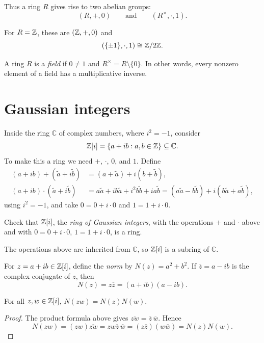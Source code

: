\documentclass[reqno,11pt]{amsart}
\newcommand{\C}{\mathbb{C}}
\begin{document}
Thus a ring $R$ gives rise to two abelian groups:
\[
  (R,+,0)\qquad\text{and}\qquad(R^\times,\cdot,1).
\]

\begin{example}
For $R=\mathbb{Z}$, these are $(\mathbb{Z},+,0)$ and
\[
  (\{\pm1\},\cdot,1)\cong\mathbb{Z}/2\mathbb{Z}.
\]
\end{example}

\begin{define}[Field]
A ring $R$ is a \emph{field} if $0\neq1$ and
$R^\times=R\setminus\{0\}$. In other words, every nonzero element
of a field has a multiplicative inverse.
\end{define}

\section{Gaussian integers}

\begin{example}
Inside the ring $\C$ of complex numbers, where $i^2=-1$, consider
\[
  \Z[i]=\{a+ib:a,b\in\Z\}\subseteq\C.
\]
To make this a ring we need $+$, $\cdot$, $0$, and $1$. Define
\begin{align*}
  (a+ib)+(\tilde a+i\tilde b)&=(a+\tilde a)+i(b+\tilde b),\\
  (a+ib)\cdot(\tilde a+i\tilde b)
  &=a\tilde a+ib\tilde a+i^2b\tilde b+ia\tilde b
   =(a\tilde a-b\tilde b)+i(b\tilde a+a\tilde b),
\end{align*}
using $i^2=-1$, and take $0=0+i\cdot0$ and $1=1+i\cdot0$.
\end{example}

\begin{exercise}
Check that $\mathbb{Z}[i]$, the \emph{ring of Gaussian integers}, with the
operations $+$ and $\cdot$ above and with $0=0+i\cdot0$,
$1=1+i\cdot0$, is a ring.
\end{exercise}

The operations above are inherited from $\C$, so $\mathbb{Z}[i]$ is a
subring of $\C$.

\begin{define}
For $z=a+ib\in\mathbb{Z}[i]$, define the \emph{norm} by $N(z)=a^2+b^2$.
If $\overline{z}=a-ib$ is the complex conjugate of $z$, then
\[
  N(z)=z\overline{z}=(a+ib)(a-ib).
\]
\end{define}

\begin{proposition}
For all $z,w\in\mathbb{Z}[i]$, $N(zw)=N(z)N(w)$.
\end{proposition}
\begin{proof}
The product formula above gives
$\overline{zw}=\overline{z}\,\overline{w}$. Hence
\[
  N(zw)=(zw)\overline{zw}
  =zw\overline{z}\,\overline{w}
  =(z\overline{z})(w\overline{w})=N(z)N(w).
\]
\end{proof}
\end{document}
